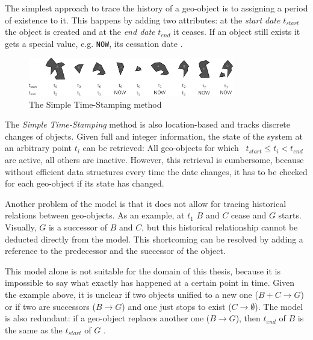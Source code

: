 The simplest approach to trace the history of a geo-object is to assigning a period of existence to it. This happens by adding two attributes: at the \emph{start date} $t_{start}$ the object is created and at the \emph{end date} $t_{end}$ it ceases. If an object still exists it gets a special value, e.g. \texttt{NOW}, its cessation date
\cite{hunter90timestamping}.

\begin{figure}[H]
  \vspace{1em}
  \centering
  \includegraphics[width=0.8\textwidth]{graphics/basics/stdm/simple_time_stamping}
  \caption{The Simple Time-Stamping method \cite{hunter90timestamping}}
  \label{fig:simple_time_stamping}
\end{figure}

The \emph{Simple Time-Stamping} method is also location-based and tracks discrete changes of objects. Given full and integer information, the state of the system at an arbitrary point $t_i$ can be retrieved: All geo-objects for which ~$t_{start} \leq t_i < t_{end}$~ are active, all others are inactive. However, this retrieval is cumbersome, because without efficient data structures every time the date changes, it has to be checked for each geo-object if its state has changed.

Another problem of the model is that it does not allow for tracing historical relations between geo-objects. As an example, at $t_1$ $B$ and $C$ cease and $G$ starts. Visually, $G$ is a successor of $B$ and $C$, but this historical relationship cannot be deducted directly from the model. This shortcoming can be resolved by adding a reference to the predecessor and the successor of the object.

This model alone is not suitable for the domain of this thesis, because it is impossible to say what exactly has happened at a certain point in time. Given the example above, it is unclear if two objects unified to a new one ($B+C \to G$) or if two are successors ($B \to G$) and one just stops to exist ($C \to \emptyset$). The model is also redundant: if a geo-object replaces another one ($B \to G$), then $t_{end}$ of $B$ is the same as the $t_{start}$ of $G$
\cite[p. 46-47]{solana2014spatio}.



